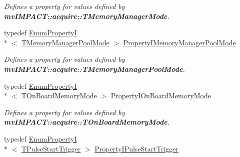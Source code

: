 \begin{DoxyCompactItemize}
\begin{DoxyCompactList}\small\item\em Defines a property for values defined by {\bfseries mv\+I\+M\+P\+A\+C\+T\+::acquire\+::\+T\+Memory\+Manager\+Mode}. \end{DoxyCompactList}\item 
\hypertarget{group___device_specific_interface_gae8ead74d2d3b067021f1eb34ecc16dd1}{typedef \hyperlink{classmv_i_m_p_a_c_t_1_1acquire_1_1_enum_property_i}{Enum\+Property\+I}\\*
$<$ \hyperlink{group___common_interface_ga01e39bfd4e5f1b4427bc403985f53835}{T\+Memory\+Manager\+Pool\+Mode} $>$ \hyperlink{group___device_specific_interface_gae8ead74d2d3b067021f1eb34ecc16dd1}{Property\+I\+Memory\+Manager\+Pool\+Mode}}\label{group___device_specific_interface_gae8ead74d2d3b067021f1eb34ecc16dd1}

\begin{DoxyCompactList}\small\item\em Defines a property for values defined by {\bfseries mv\+I\+M\+P\+A\+C\+T\+::acquire\+::\+T\+Memory\+Manager\+Pool\+Mode}. \end{DoxyCompactList}\item 
\hypertarget{group___device_specific_interface_ga8f0448335d196077bb5866dfc16b0d7e}{typedef \hyperlink{classmv_i_m_p_a_c_t_1_1acquire_1_1_enum_property_i}{Enum\+Property\+I}\\*
$<$ \hyperlink{group___device_specific_interface_gafeb5475c72e0081fb102cb94b4c26a1b}{T\+On\+Board\+Memory\+Mode} $>$ \hyperlink{group___device_specific_interface_ga8f0448335d196077bb5866dfc16b0d7e}{Property\+I\+On\+Board\+Memory\+Mode}}\label{group___device_specific_interface_ga8f0448335d196077bb5866dfc16b0d7e}

\begin{DoxyCompactList}\small\item\em Defines a property for values defined by {\bfseries mv\+I\+M\+P\+A\+C\+T\+::acquire\+::\+T\+On\+Board\+Memory\+Mode}. \end{DoxyCompactList}\item 
\hypertarget{group___device_specific_interface_gac582d13155205627b2f103a6d612c3df}{typedef \hyperlink{classmv_i_m_p_a_c_t_1_1acquire_1_1_enum_property_i}{Enum\+Property\+I}\\*
$<$ \hyperlink{group___device_specific_interface_gad2cb2c5b518e2428f7b81a3dafc5f0a0}{T\+Pulse\+Start\+Trigger} $>$ \hyperlink{group___device_specific_interface_gac582d13155205627b2f103a6d612c3df}{Property\+I\+Pulse\+Start\+Trigger}}\label{group___device_specific_interface_gac582d13155205627b2f103a6d612c3df}


\end{DoxyCompactItemize}
